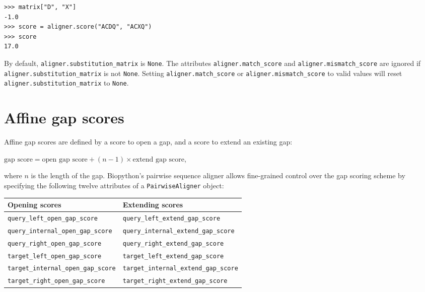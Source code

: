 \begin{itemize}
\begin{verbatim}
>>> matrix["D", "X"]
-1.0
>>> score = aligner.score("ACDQ", "ACXQ")
>>> score
17.0
\end{verbatim}
\end{itemize}

By default, \verb+aligner.substitution_matrix+ is \verb+None+.
The attributes \verb+aligner.match_score+ and \verb+aligner.mismatch_score+ are
ignored if \verb+aligner.substitution_matrix+ is not \verb+None+.
Setting \verb+aligner.match_score+ or \verb+aligner.mismatch_score+ to valid values will reset \verb+aligner.substitution_matrix+ to \verb+None+.

\section{Affine gap scores}
\label{sec:pairwise-affine-gapscores}

Affine gap scores are defined by a score to open a gap, and a score to extend
an existing gap:

$\textrm{gap score} = \textrm{open gap score} + (n-1) \times \textrm{extend gap score}$,

where $n$ is the length of the gap.
Biopython's pairwise sequence aligner allows fine-grained control over the gap
scoring scheme by specifying the following twelve attributes of a \verb+PairwiseAligner+ object:

\begin{table}[h]
\begin{tabular}{|l|l|}
\hline
\textbf{Opening scores}               & \textbf{Extending scores} \\
\hline
\verb+query_left_open_gap_score+      & \verb+query_left_extend_gap_score+ \\
\verb+query_internal_open_gap_score+  & \verb+query_internal_extend_gap_score+ \\
\verb+query_right_open_gap_score+     & \verb+query_right_extend_gap_score+ \\
\verb+target_left_open_gap_score+     & \verb+target_left_extend_gap_score+ \\
\verb+target_internal_open_gap_score+ & \verb+target_internal_extend_gap_score+ \\
\verb+target_right_open_gap_score+    & \verb+target_right_extend_gap_score+ \\
\hline
\end{tabular}
\end{table}

